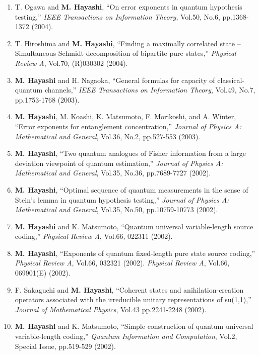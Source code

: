 \documentclass[a4paper,12pt,oneside]{article}
\begin{document}
\begin{enumerate}
\item
T. Ogawa and \textbf{M. Hayashi}, 
``On error exponents in quantum hypothesis testing,'' 
{\em IEEE Transactions on Information Theory}, Vol.50, No.6, pp.1368-1372 (2004).

\item
T. Hiroshima and \textbf{M. Hayashi}, ``Finding a maximally correlated state -- Simultaneous Schmidt decomposition of bipartite pure states,'' 
{\em Physical Review A}, Vol.70, (R)030302 (2004).

\item
\textbf{M. Hayashi} and H. Nagaoka, ``General formulas for capacity of classical-quantum channels,'' 
{\em IEEE Transactions on Information Theory}, Vol.49, No.7, pp.1753-1768 (2003).

\item
\textbf{M. Hayashi}, M. Koashi, K. Matsumoto, F. Morikoshi, and A. Winter, 
``Error exponents for entanglement concentration,'' 
{\em Journal of Physics A: Mathematical and General}, Vol.36, No.2, pp.527-553 (2003). 

\item
\textbf{M. Hayashi}, ``Two quantum analogues of Fisher information from a large deviation viewpoint of quantum estimation,'' 
{\em Journal of Physics A: Mathematical and General}, Vol.35, No.36, pp.7689-7727 (2002).

\item
\textbf{M. Hayashi}, ``Optimal sequence of quantum measurements in the sense of Stein's lemma in quantum hypothesis testing,'' 
{\em Journal of Physics A: Mathematical and General}, Vol.35, No.50, pp.10759-10773 (2002).

\item
\textbf{M. Hayashi} and K. Matsumoto, ``Quantum universal variable-length source coding,'' 
{\em Physical Review A}, Vol.66, 022311 (2002). 

\item
\textbf{M. Hayashi}, ``Exponents of quantum fixed-length pure state source coding,'' 
{\em Physical Review A}, Vol.66, 032321 (2002). 
{\em Physical Review A}, Vol.66, 069901(E) (2002).

\item
F. Sakaguchi and \textbf{M. Hayashi}, ``Coherent states and anihilation-creation operators associated with the irreducible unitary representations of su(1,1),'' 
{\em Journal of Mathematical Physics}, Vol.43 pp.2241-2248 (2002).

\item
\textbf{M. Hayashi} and K. Matsumoto, ``Simple construction of quantum universal variable-length coding,'' 
{\em Quantum Information and Computation}, Vol.2, Special Issue, pp.519-529 (2002).


\end{enumerate}
\end{document}
